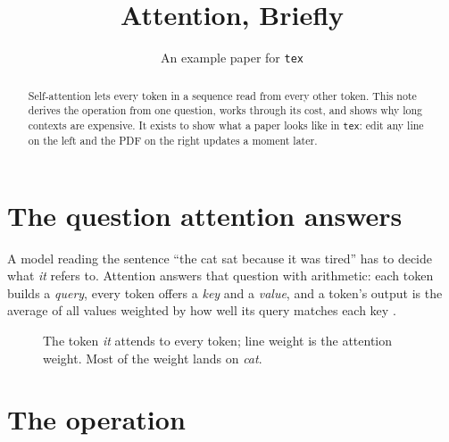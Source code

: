 \documentclass[11pt]{article}
\title{Attention, Briefly}
\author{An example paper for \texttt{tex}}
\date{}
\begin{document}
\maketitle

\begin{abstract}
Self-attention lets every token in a sequence read from every other token. This note derives the operation from one question, works through its cost, and shows why long contexts are expensive. It exists to show what a paper looks like in \texttt{tex}: edit any line on the left and the PDF on the right updates a moment later.
\end{abstract}

\section{The question attention answers}\label{sec:question}

A model reading the sentence ``the cat sat because it was tired'' has to decide what \emph{it} refers to. Attention answers that question with arithmetic: each token builds a \emph{query}, every token offers a \emph{key} and a \emph{value}, and a token's output is the average of all values weighted by how well its query matches each key \cite{vaswani2017}.

\begin{figure}[ht]
\centering
{}
\caption{The token \emph{it} attends to every token; line weight is the attention weight.
Most of the weight lands on \emph{cat}.}
\label{fig:weights}
\end{figure}

\section{The operation}\label{sec:op}
\end{document}
